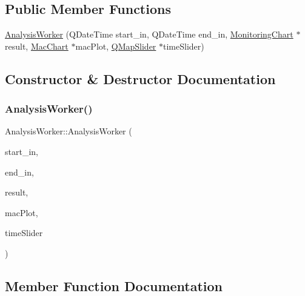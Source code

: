 \subsection*{Public Member Functions}
\begin{DoxyCompactItemize}
\item 
\hyperlink{class_analysis_worker_a2c64e8efacd16fef8aea94e93c484f2c}{Analysis\+Worker} (Q\+Date\+Time start\+\_\+in, Q\+Date\+Time end\+\_\+in, \hyperlink{class_monitoring_chart}{Monitoring\+Chart} $\ast$result, \hyperlink{class_mac_chart}{Mac\+Chart} $\ast$mac\+Plot, \hyperlink{class_q_map_slider}{Q\+Map\+Slider} $\ast$time\+Slider)
\end{DoxyCompactItemize}


\subsection{Constructor \& Destructor Documentation}
\mbox{\label{class_analysis_worker_a2c64e8efacd16fef8aea94e93c484f2c}} 
\subsubsection{\texorpdfstring{Analysis\+Worker()}{AnalysisWorker()}}
{\footnotesize\ttfamily Analysis\+Worker\+::\+Analysis\+Worker (\begin{DoxyParamCaption}\item[{Q\+Date\+Time}]{start\+\_\+in,  }\item[{Q\+Date\+Time}]{end\+\_\+in,  }\item[{\hyperlink{class_monitoring_chart}{Monitoring\+Chart} $\ast$}]{result,  }\item[{\hyperlink{class_mac_chart}{Mac\+Chart} $\ast$}]{mac\+Plot,  }\item[{\hyperlink{class_q_map_slider}{Q\+Map\+Slider} $\ast$}]{time\+Slider }\end{DoxyParamCaption})\hspace{0.3cm}{\ttfamily [inline]}}



\subsection{Member Function Documentation}
\mbox{\label{class_analysis_worker_ac440daa1329ccf74e6cb08282da1a310}} 
